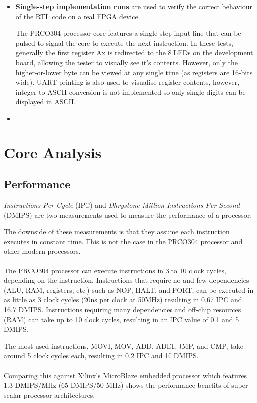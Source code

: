 \documentclass[11pt,a4paper]{report}
\newcommand{\scname}{PRCO304}
\begin{document}
\begin{itemize}
\item{\textbf{Single-step implementation runs} are used to verify the correct behaviour of the RTL code on a real FPGA device. 

The \scname{} processor core features a single-step input line that can be pulsed to signal the core to execute the next instruction. In these tests, generally the first register Ax is redirected to the 8 LEDs on the development board, allowing the tester to visually see it's contents. However, only the higher-or-lower byte can be viewed at any single time (as registers are 16-bits wide). UART printing is also used to visualise register contents, however, integer to ASCII conversion is not implemented so only single digits can be displayed in ASCII.}

\item{
}
\end{itemize}



\newpage
\section{Core Analysis}
\subsection{Performance}
\textit{Instructions Per Cycle} (IPC) and \textit{Dhrystone Million Instructions Per Second} (DMIPS) are two measurements used to measure the performance of a processor.

The downside of these measurements is that they assume each instruction executes in constant time. This is not the case in the \scname{} processor and other modern processors.
\\\\
The \scname{} processor can execute instructions in 3 to 10 clock cycles, depending on the instruction. Instructions that require no and few dependencies (ALU, RAM, registers, etc.) such as NOP, HALT, and PORT, can be executed in as little as 3 clock cycles (20ns per clock at 50MHz) resulting in 0.67 IPC and 16.7 DMIPS. Instructions requiring many dependencies and off-chip resources (RAM) can take up to 10 clock cycles, resulting in an IPC value of 0.1 and 5 DMIPS.

The most used instructions, MOVI, MOV, ADD, ADDI, JMP, and CMP, take around 5 clock cycles each, resulting in 0.2 IPC and 10 DMIPS.
\\\\
Comparing this against Xilinx's MicroBlaze embedded processor which features 1.3 DMIPS/MHz (65 DMIPS/50 MHz) shows the performance benefits of super-scalar processor architectures. 
\end{document}
